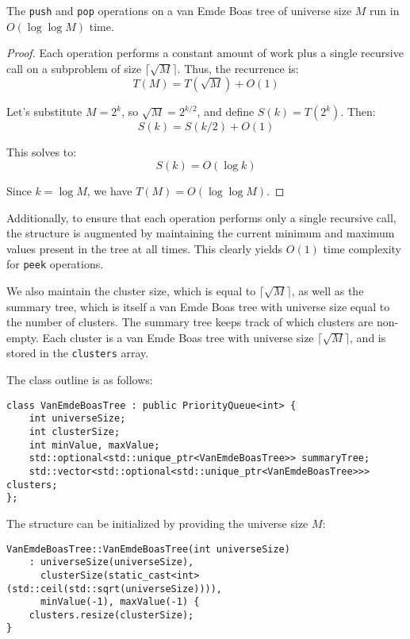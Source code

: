 \begin{lemma}
The \texttt{push} and \texttt{pop} operations on a van Emde Boas tree of universe size \( M \) run in \( O(\log \log M) \) time.
\end{lemma}

\begin{proof}
Each operation performs a constant amount of work plus a single recursive call on a subproblem of size \( \lceil \sqrt{M} \rceil \). Thus, the recurrence is:
\[T(M) = T(\sqrt{M}) + O(1)\]

Let's substitute \( M = 2^k \), so \( \sqrt{M} = 2^{k/2} \), and define \( S(k) = T(2^k) \). Then:
\[ S(k) = S(k/2) + O(1) \]

This solves to:
\[ S(k) = O(\log k) \]

Since \( k = \log M \), we have \( T(M) = O(\log \log M) \).
\end{proof}

Additionally, to ensure that each operation performs only a single recursive call, the structure is augmented by maintaining the current minimum and maximum values present in the tree at all times. This clearly yields \( O(1) \) time complexity for \texttt{peek} operations.

We also maintain the cluster size, which is equal to \( \lceil \sqrt{M} \rceil \), as well as the summary tree, which is itself a van Emde Boas tree with universe size equal to the number of clusters. The summary tree keeps track of which clusters are non-empty. Each cluster is a van Emde Boas tree with universe size \( \lceil \sqrt{M} \rceil \), and is stored in the \texttt{clusters} array.

The class outline is as follows:

\begin{verbatim}
class VanEmdeBoasTree : public PriorityQueue<int> {
    int universeSize;
    int clusterSize;
    int minValue, maxValue;
    std::optional<std::unique_ptr<VanEmdeBoasTree>> summaryTree;
    std::vector<std::optional<std::unique_ptr<VanEmdeBoasTree>>> clusters;
};
\end{verbatim}

The structure can be initialized by providing the universe size \( M \):

\begin{verbatim}
VanEmdeBoasTree::VanEmdeBoasTree(int universeSize)
    : universeSize(universeSize), 
      clusterSize(static_cast<int>(std::ceil(std::sqrt(universeSize)))),
      minValue(-1), maxValue(-1) {
    clusters.resize(clusterSize);
}
\end{verbatim}

